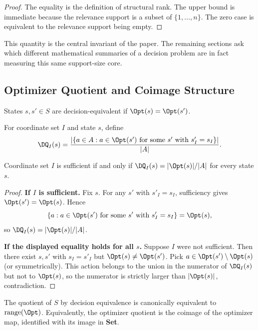 \begin{proof}
The equality is the definition of structural rank. The upper bound is immediate because the relevance support is a subset of $\{1,\dots,n\}$. The zero case is equivalent to the relevance support being empty.
\end{proof}

This quantity is the central invariant of the paper. The remaining sections ask which different mathematical summaries of a decision problem are in fact measuring this same support-size core.

\subsection{Optimizer Quotient and Coimage Structure}

\begin{definition}\label{def:decision-equiv}
States $s,s' \in S$ are decision-equivalent if $\Opt(s)=\Opt(s')$.
\end{definition}

\begin{definition}\label{def:decision-quotient}
For coordinate set $I$ and state $s$, define
\[
\DQ_I(s) =
\frac{|\{a \in A : a \in \Opt(s') \text{ for some } s' \text{ with } s'_I=s_I\}|}{|A|}.
\]
\end{definition}

\begin{proposition}\label{prop:sufficiency-char}
Coordinate set $I$ is sufficient if and only if $\DQ_I(s)=|\Opt(s)|/|A|$ for every state $s$.
\end{proposition}

\begin{proof}
\textbf{If $I$ is sufficient.} Fix $s$. For any $s'$ with $s'_I=s_I$, sufficiency gives $\Opt(s')=\Opt(s)$. Hence
\[
\{a : a\in \Opt(s') \text{ for some } s' \text{ with } s'_I=s_I\}=\Opt(s),
\]
so $\DQ_I(s)=|\Opt(s)|/|A|$.

\textbf{If the displayed equality holds for all $s$.} Suppose $I$ were not sufficient. Then there exist $s,s'$ with $s_I=s'_I$ but $\Opt(s)\neq\Opt(s')$. Pick $a\in \Opt(s')\setminus \Opt(s)$ (or symmetrically). This action belongs to the union in the numerator of $\DQ_I(s)$ but not to $\Opt(s)$, so the numerator is strictly larger than $|\Opt(s)|$, contradiction.
\end{proof}

\begin{proposition}\label{prop:optimizer-coimage}
The quotient of $S$ by decision equivalence is canonically equivalent to $\operatorname{range}(\Opt)$. Equivalently, the optimizer quotient is the coimage of the optimizer map, identified with its image in \textbf{Set}.
\end{proposition}

